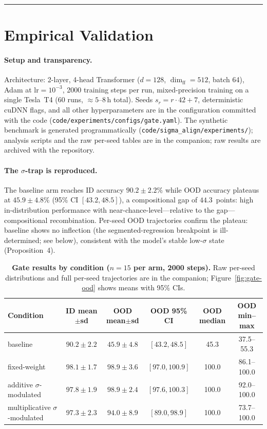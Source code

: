 \documentclass{article}
\theoremstyle{definition}
\begin{document}
\noindent\rule{\linewidth}{0.4pt}

\section{Empirical Validation}\label{sec:empirical-validation}

\paragraph*{Setup and transparency.}
Architecture: 2-layer, 4-head Transformer ($d = 128$, $\dim_{\text{ff}} = 512$,
batch 64), Adam at $\text{lr} = 10^{-3}$, 2000 training steps per run,
mixed-precision training on a single Tesla~T4 (60 runs, $\approx 5$--8\,h
total). Seeds $s_r = r \cdot 42 + 7$, deterministic cuDNN flags, and all
other hyperparameters are in the configuration committed with the code
(\texttt{code/experiments/configs/gate.yaml}). The synthetic benchmark is
generated programmatically (\texttt{code/sigma\_align/experiments/});
analysis scripts and the raw per-seed tables are in the companion; raw
results are archived with the repository.

\paragraph*{The $\sigma$-trap is reproduced.}
The baseline arm reaches ID accuracy $90.2 \pm 2.2\%$ while OOD accuracy
plateaus at $45.9 \pm 4.8\%$ (95\% CI $[43.2, 48.5]$), a compositional
gap of $44.3$~points: high in-distribution performance with
near-chance-level---relative to the gap---compositional recombination.
Per-seed OOD trajectories confirm the plateau: baseline shows no
inflection (the segmented-regression breakpoint is ill-determined; see
below), consistent with the model's stable low-$\sigma$ state
(Proposition~4).

\begin{table}[htbp]
\centering
\small
\caption{\textbf{Gate results by condition ($n = 15$ per arm, 2000 steps).}
Raw per-seed distributions and full per-seed trajectories are in the
companion; Figure~\ref{fig:gate-ood} shows means with 95\% CIs.}\label{tab:gate-results}
\begin{tabular}{l c c c c c}
\toprule
\textbf{Condition} & \textbf{ID mean$\pm$sd} & \textbf{OOD mean$\pm$sd} & \textbf{OOD 95\% CI} & \textbf{OOD median} & \textbf{OOD min--max} \\
\midrule
baseline & $90.2 \pm 2.2$ & $45.9 \pm 4.8$ & $[43.2, 48.5]$ & 45.3 & 37.5--55.3 \\
fixed-weight & $98.1 \pm 1.7$ & $98.9 \pm 3.6$ & $[97.0, 100.9]$ & 100.0 & 86.1--100.0 \\
additive $\sigma$-modulated & $97.8 \pm 1.9$ & $98.9 \pm 2.4$ & $[97.6, 100.3]$ & 100.0 & 92.0--100.0 \\
multiplicative $\sigma$-modulated & $97.3 \pm 2.3$ & $94.0 \pm 8.9$ & $[89.0, 98.9]$ & 100.0 & 73.7--100.0 \\
\bottomrule
\end{tabular}
\end{table}
\end{document}
